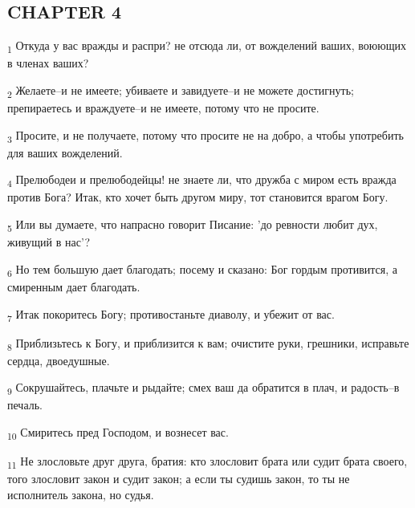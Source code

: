 \subsection{CHAPTER 4}
\begin{tcolorbox}
\textsubscript{1} Откуда у вас вражды и распри? не отсюда ли, от вожделений ваших, воюющих в членах ваших?
\end{tcolorbox}
\begin{tcolorbox}
\textsubscript{2} Желаете--и не имеете; убиваете и завидуете--и не можете достигнуть; препираетесь и враждуете--и не имеете, потому что не просите.
\end{tcolorbox}
\begin{tcolorbox}
\textsubscript{3} Просите, и не получаете, потому что просите не на добро, а чтобы употребить для ваших вожделений.
\end{tcolorbox}
\begin{tcolorbox}
\textsubscript{4} Прелюбодеи и прелюбодейцы! не знаете ли, что дружба с миром есть вражда против Бога? Итак, кто хочет быть другом миру, тот становится врагом Богу.
\end{tcolorbox}
\begin{tcolorbox}
\textsubscript{5} Или вы думаете, что напрасно говорит Писание: 'до ревности любит дух, живущий в нас'?
\end{tcolorbox}
\begin{tcolorbox}
\textsubscript{6} Но тем большую дает благодать; посему и сказано: Бог гордым противится, а смиренным дает благодать.
\end{tcolorbox}
\begin{tcolorbox}
\textsubscript{7} Итак покоритесь Богу; противостаньте диаволу, и убежит от вас.
\end{tcolorbox}
\begin{tcolorbox}
\textsubscript{8} Приблизьтесь к Богу, и приблизится к вам; очистите руки, грешники, исправьте сердца, двоедушные.
\end{tcolorbox}
\begin{tcolorbox}
\textsubscript{9} Сокрушайтесь, плачьте и рыдайте; смех ваш да обратится в плач, и радость--в печаль.
\end{tcolorbox}
\begin{tcolorbox}
\textsubscript{10} Смиритесь пред Господом, и вознесет вас.
\end{tcolorbox}
\begin{tcolorbox}
\textsubscript{11} Не злословьте друг друга, братия: кто злословит брата или судит брата своего, того злословит закон и судит закон; а если ты судишь закон, то ты не исполнитель закона, но судья.
\end{tcolorbox}
